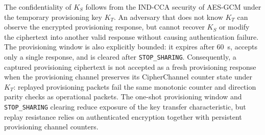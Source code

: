 \documentclass[journal]{IEEEtran}
\begin{document}
The confidentiality of $K_S$ follows from the IND-CCA security of AES-GCM under the temporary provisioning key $K_T$.
An adversary that does not know $K_T$ can observe the encrypted provisioning response, but cannot recover $K_S$ or modify the ciphertext into another valid response without causing authentication failure.
The provisioning window is also explicitly bounded: it expires after 60~s, accepts only a single response, and is cleared after \texttt{STOP\_SHARING}.
Consequently, a captured provisioning ciphertext is not accepted as a fresh provisioning response when the provisioning channel preserves its CipherChannel counter state under $K_T$: replayed provisioning packets fail the same monotonic counter and direction parity checks as operational packets. The one-shot provisioning window and \texttt{STOP\_SHARING} clearing reduce exposure of the key transfer characteristic, but replay resistance relies on authenticated encryption together with persistent provisioning channel counters.

%
\end{document}
